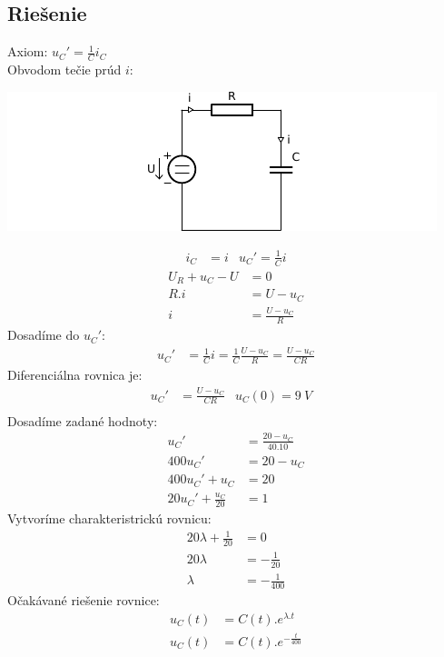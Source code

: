 \subsection{Riešenie}
Axiom: $u_{C}' = \frac{1}{C} i_{C}$ \\
Obvodom tečie prúd $i$: 
\begin{center}
  \includegraphics[width=0.8\columnwidth,keepaspectratio]{res/u5o2}
\end{center}
\begin{align*}
    i_{C} &= i & u_{C}' = \frac{1}{C} i
\end{align*}
\begin{align*}
    U_{R} + u_{C} - U &= 0 \\
    R.i &= U - u_{C}\\
    i &= \frac{U - u_{C}}{R}
\end{align*}
Dosadíme do $u_C'$:
\begin{align*}
    u_{C}' &= \frac{1}{C} i = \frac{1}{C} \frac{U - u_{C}}{R} = \frac{U - u_{C}}{C R}
\end{align*}
Diferenciálna rovnica je: 
\begin{align*}
    u_{C}' &= \frac{U - u_{C}}{C R} &  u_{C}(0) = 9~V &\\
\end{align*}
Dosadíme zadané hodnoty:
\begin{align*}
    u_{C}' &= \frac{20 - u_{C}}{40.10}  \\
    400u_{C}' &= 20 - u_{C} \\
    400u_{C}'+ u_{C} &= 20 \\
    20u_{C}' + \frac{u_{C}}{20}&= 1
\end{align*}
Vytvoríme charakteristrickú rovnicu:
\begin{align*}
    20\lambda + \frac{1}{20}&= 0 \\
    20\lambda &= -\frac{1}{20} \\
    \lambda &= -\frac{1}{400}
\end{align*}
Očakávané riešenie rovnice: 
\begin{align*}
    u_{C} (t) &= C(t).e^{\lambda.t} \\
    u_{C} (t) &= C(t).e^{-\frac{t}{400}}
\end{align*}
